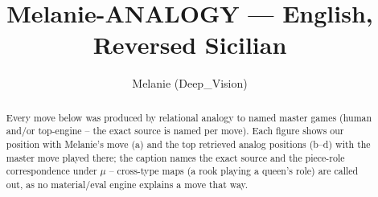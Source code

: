 \documentclass[11pt]{article}
\title{Melanie-ANALOGY — English, Reversed Sicilian}
\author{Melanie (Deep\_Vision)}
\date{}
\begin{document}
\maketitle

\begin{abstract}Every move below was produced by relational analogy to named master games (human and/or top-engine -- the exact source is named per move). Each figure shows our position with Melanie's move (a) and the top retrieved analog positions (b--d) with the master move played there; the caption names the exact source and the piece-role correspondence under $\mu$ -- cross-type maps (a rook playing a queen's role) are called out, as no material/eval engine explains a move that way.\end{abstract}

\begin{figure}[p]\centering
\begin{subfigure}{0.46\textwidth}\centering
\resizebox{\linewidth}{!}{%
\newchessgame
\chessboard[
  setfen={r1bqkb1r/ppp2ppp/1nn5/4p3/8/2N2NP1/PP1PPPBP/R1BQK2R w KQkq - 2 7},
  showmover=false,
  pgfstyle=straightmove, color=movearrow, markmove={e1-g1}
]}
\caption{}
\end{subfigure}\hfill
\begin{subfigure}{0.46\textwidth}\centering
\resizebox{\linewidth}{!}{%
\newchessgame
\chessboard[
  setfen={r1bqkb1r/ppp2ppp/1nn5/4p3/8/2N2NP1/PP1PPPBP/R1BQK2R w KQkq - 2 7},
  showmover=false,
  pgfstyle=straightmove, color=movearrow, markmove={e1-g1}
]}
\caption{}
\end{subfigure}
\\[4pt]
\begin{subfigure}{0.46\textwidth}\centering
\resizebox{\linewidth}{!}{%
\newchessgame
\chessboard[
  setfen={r1bqkb1r/ppp2ppp/1nn5/4p3/8/2N2NP1/PP1PPPBP/R1BQK2R w KQkq - 2 7},
  showmover=false,
  pgfstyle=straightmove, color=movearrow, markmove={e1-g1}
]}
\caption{}
\end{subfigure}\hfill
\begin{subfigure}{0.46\textwidth}\centering
\resizebox{\linewidth}{!}{%
\newchessgame
\chessboard[
  setfen={r1bqkb1r/ppp2ppp/1nn5/4p3/8/2N2NP1/PP1PPPBP/R1BQK2R w KQkq - 2 7},
  showmover=false,
  pgfstyle=straightmove, color=movearrow, markmove={e1-g1}
]}
\caption{}
\end{subfigure}

\end{figure}
\end{document}
